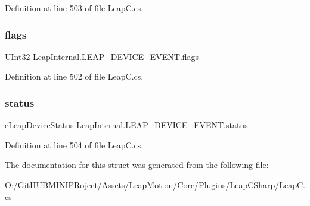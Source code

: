 Definition at line 503 of file Leap\+C.\+cs.

\mbox{\label{struct_leap_internal_1_1_l_e_a_p___d_e_v_i_c_e___e_v_e_n_t_a68f2f7e3e5c44932a90b201b87acabb8}} 
\subsubsection{\texorpdfstring{flags}{flags}}
{\footnotesize\ttfamily U\+Int32 Leap\+Internal.\+L\+E\+A\+P\+\_\+\+D\+E\+V\+I\+C\+E\+\_\+\+E\+V\+E\+N\+T.\+flags}



Definition at line 502 of file Leap\+C.\+cs.

\mbox{\label{struct_leap_internal_1_1_l_e_a_p___d_e_v_i_c_e___e_v_e_n_t_a1634e22669a78768f6e8e584ad4af0af}} 
\subsubsection{\texorpdfstring{status}{status}}
{\footnotesize\ttfamily \mbox{\hyperlink{namespace_leap_internal_a16b28ea79f39b6205c514b3e9b075bed}{e\+Leap\+Device\+Status}} Leap\+Internal.\+L\+E\+A\+P\+\_\+\+D\+E\+V\+I\+C\+E\+\_\+\+E\+V\+E\+N\+T.\+status}



Definition at line 504 of file Leap\+C.\+cs.



The documentation for this struct was generated from the following file\+:\begin{DoxyCompactItemize}
\item 
O\+:/\+Git\+H\+U\+B\+M\+I\+N\+I\+P\+Roject/\+Assets/\+Leap\+Motion/\+Core/\+Plugins/\+Leap\+C\+Sharp/\mbox{\hyperlink{_leap_c_8cs}{Leap\+C.\+cs}}\end{DoxyCompactItemize}
